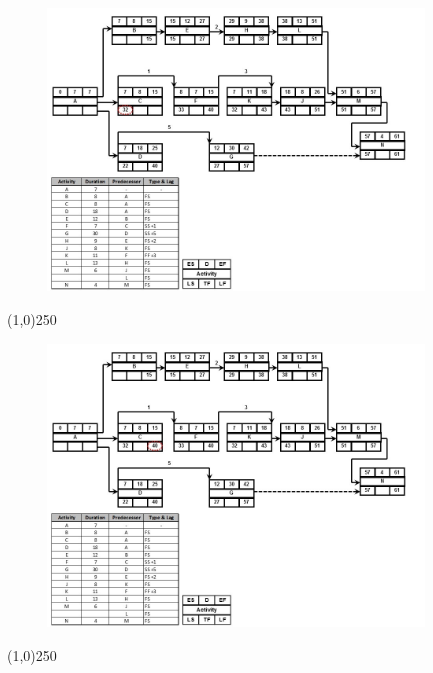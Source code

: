 \begin{frame}
\begin{figure}
	\centering
		\includegraphics[width = 10.0cm]{oldnotes/Slide234.jpg}
\end{figure}
\end{frame}
\begin{center}\line(1,0){250}\end{center}




\begin{frame}
\begin{figure}
	\centering
		\includegraphics[width = 10.0cm]{oldnotes/Slide235.jpg}
\end{figure}
\end{frame}
\begin{center}\line(1,0){250}\end{center}





